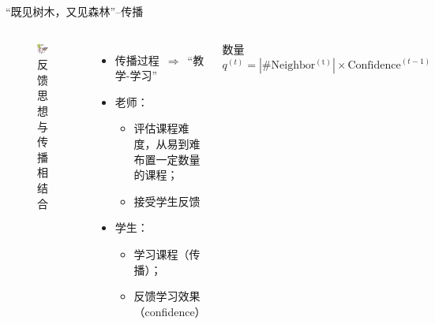\begin{frame}{``既见树木，又见森林''--传播}

\begin{columns}[c]
\begin{figure}
    \centering
    \includegraphics[width=\linewidth]{figures/TLLTillustrator.eps}
    \caption{反馈思想与传播相结合}
\end{figure}

\begin{itemize}
\item 传播过程~$\Rightarrow$~``教学-学习''
\item 老师：
\begin{itemize}
\item 评估课程难度，从易到难布置一定数量的课程；
\item 接受学生反馈
\end{itemize}
\item 学生：
\begin{itemize}
\item 学习课程（传播）；
\item 反馈学习效果（confidence）
\end{itemize}
\end{itemize}
\begin{block}{数量}
\small $q^{(t)}={|\mathrm{\#Neighbor^{(t)}}|\times \mathrm{Confidence}^{(t-1)}}$
\end{block}
\end{columns}
\end{frame}
